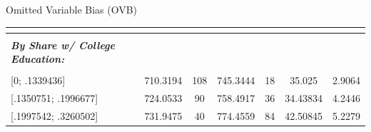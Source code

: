 \documentclass[notes,10pt, aspectratio=169]{beamer}
\begin{document}
\begin{frame}{Omitted Variable Bias (OVB)}
\begin{center}
{\begin{table}[]
\begin{tabular}{l|cc|cc|cc|}
            \multicolumn{1}{|l|}{} &                                                                &                                &                                                                &                                & \multicolumn{1}{c|}{}                                             &                      \\\hline
            \multicolumn{1}{|l|}{} &                                                                &                                &                                                                &                                & \multicolumn{1}{c|}{}                                             &                      \\
            \multicolumn{1}{|l|}{\textbf{\textit{By Share w/ College Education:}}} &                                                                &                                &                                                                &                                & \multicolumn{1}{c|}{}                                             &                      \\
            \multicolumn{1}{|l|}{} &                                                                &                                &                                                                &                                & \multicolumn{1}{c|}{}                                             &                      \\
            \multicolumn{1}{|l|}{{[}0; .1339436{]}}                       & 710.3194                                                       & 108                            & 745.3444                                                       & 18                             & \multicolumn{1}{c|}{35.025}                                       & 2.9064               \\
            \multicolumn{1}{|l|}{{[}.1350751; .1996677{]}}                & 724.0533                                                       & 90                             & 758.4917                                                       & 36                             & \multicolumn{1}{c|}{34.43834}                                     & 4.2446               \\
            \multicolumn{1}{|l|}{{[}.1997542; .3260502{]}}                & 731.9475                                                       & 40                             & 774.4559                                                       & 84                             & \multicolumn{1}{c|}{42.50845}                                     & 5.2279               \\

\end{tabular}
\end{table}}
\end{center}
\end{frame}
\end{document}
